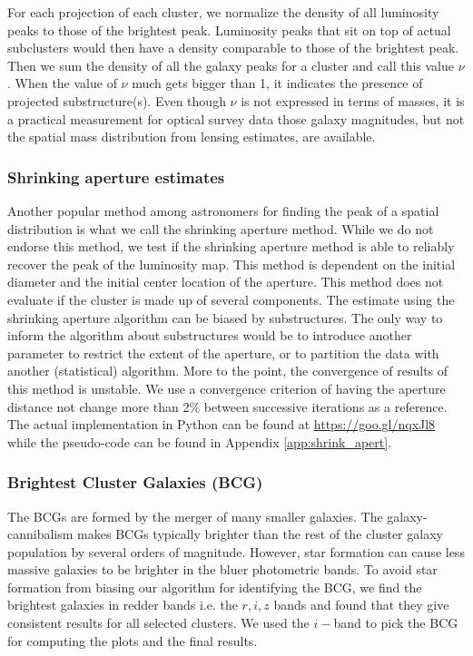 For each projection of each cluster, we normalize the density of all 
luminosity peaks to those of the brightest peak. 
Luminosity peaks that sit on top of actual subclusters would then have a density 
comparable to those of the brightest peak. 
Then we sum the density of all the galaxy peaks for a cluster and call this value
$\nu$. When the value of $\nu$ much gets bigger than 1, it indicates the presence 
of projected substructure(s). Even though 
$\nu$ is not expressed in terms of masses, it is a practical measurement
for optical survey data those galaxy magnitudes, but not the spatial mass distribution 
from lensing estimates, are available. 

\subsubsection{Shrinking aperture estimates}

Another popular method among astronomers for finding the peak of a spatial
distribution is what we call the shrinking aperture method.
While we do not endorse this method,
we test if the shrinking aperture method is able to reliably recover the 
peak of the luminosity map.
This method is dependent on the initial diameter and the initial center 
location of the aperture.
This method does not evaluate if the cluster is made up of
several components.
The estimate using the shrinking aperture algorithm can be biased by
substructures. The only way to inform the algorithm about substructures would
be to introduce another parameter to restrict the extent of the aperture, or to
partition the data with another (statistical) algorithm.
More to the point, the convergence of results of this method is unstable. We use a
convergence criterion of having the aperture distance not change more than 2\% 
between successive iterations as a reference. The actual implementation in
{\sc Python} can be found at \href{https://goo.gl/nqxJl8}{https://goo.gl/nqxJl8} while
the pseudo-code can be found in Appendix \ref{app:shrink_apert}.

\subsubsection{Brightest Cluster Galaxies (BCG)}
The BCGs are formed by the merger of many smaller
galaxies. The galaxy-cannibalism makes BCGs typically brighter than the rest of 
the cluster galaxy population by several orders of magnitude. 
However, star formation can cause
less massive galaxies to be brighter in the bluer photometric bands.
To avoid star formation from biasing our algorithm for identifying the
BCG, we find the brightest galaxies in redder bands i.e. the $r, i, z$
bands and found that they give consistent results for all selected clusters. 
We used the $i-$band to pick the BCG for computing the plots and the final results. 
 
